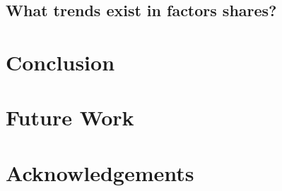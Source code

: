 \documentclass[preprint,authoryear,12pt]{elsarticle}\usepackage[]{graphicx}\usepackage[]{color}
\begin{document}
\subsection{What trends exist in factors shares?} 
\label{sec:factor_shares}































\section{Conclusion}
\label{sec:Conclusion}


\section{Future Work}
\label{sec:FutureWork}




\section*{Acknowledgements}
\label{sec:Acknowledgements}





\end{document}
